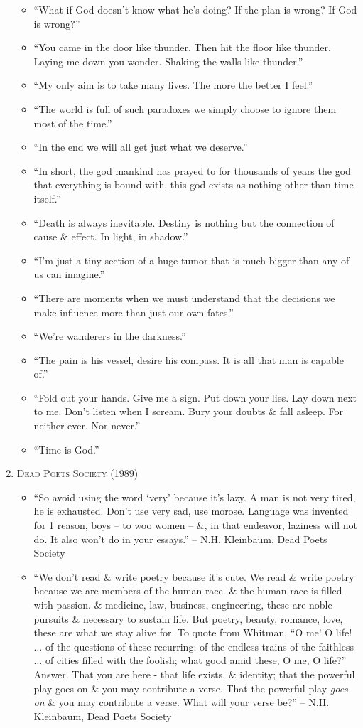 \documentclass[oneside]{book}
\numberwithin{equation}{section}
\begin{document}
\begin{enumerate}
\begin{itemize}
		\item ``What if God doesn't know what he's doing? If the plan is wrong? If God is wrong?''
		\item ``You came in the door like thunder. Then hit the floor like thunder. Laying me down you wonder. Shaking the walls like thunder.''
		\item ``My only aim is to take many lives. The more the better I feel.''
		\item ``The world is full of such paradoxes we simply choose to ignore them most of the time.''
		\item ``In the end we will all get just what we deserve.''
		\item ``In short, the god mankind has prayed to for thousands of years the god that everything is bound with, this god exists as nothing other than time itself.''
		\item ``Death is always inevitable. Destiny is nothing but the connection of cause \& effect. In light, in shadow.''
		\item ``I'm just a tiny section of a huge tumor that is much bigger than any of us can imagine.''
		\item ``There are moments when we must understand that the decisions we make influence more than just our own fates.''
		\item ``We're wanderers in the darkness.''
		\item ``The pain is his vessel, desire his compass. It is all that man is capable of.''
		\item ``Fold out your hands. Give me a sign. Put down your lies. Lay down next to me. Don't listen when I scream. Bury your doubts \& fall asleep. For neither ever. Nor never.''
		\item ``Time is God.''
	\end{itemize}	
	\item \textsc{Dead Poets Society} (1989)
	\begin{itemize}
		\item ``So avoid using the word `very' because it's lazy. A man is not very tired, he is exhausted. Don't use very sad, use morose. Language was invented for 1 reason, boys -- to woo women -- \&, in that endeavor, laziness will not do. It also won't do in your essays.'' --  N.H. Kleinbaum, Dead Poets Society
		\item ``We don't read \& write poetry because it's cute. We read \& write poetry because we are members of the human race. \& the human race is filled with passion. \& medicine, law, business, engineering, these are noble pursuits \& necessary to sustain life. But poetry, beauty, romance, love, these are what we stay alive for. To quote from Whitman, ``O me! O life! $\ldots$ of the questions of these recurring; of the endless trains of the faithless $\ldots$ of cities filled with the foolish; what good amid these, O me, O life?'' Answer. That you are here - that life exists, \& identity; that the powerful play goes on \& you may contribute a verse. That the powerful play \emph{goes on} \& you may contribute a verse. What will your verse be?'' --  N.H. Kleinbaum, Dead Poets Society

\end{itemize}
\end{enumerate}
\end{document}
